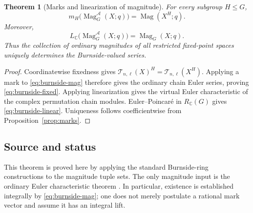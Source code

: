 \documentclass[11pt,a4paper]{article}
\numberwithin{equation}{section}
\newtheorem{theorem}{Theorem}[section]
\theoremstyle{definition}
\theoremstyle{remark}
\newcommand{\C}{\mathbb C}
\newcommand{\G}{G}
\newcommand{\Mag}{\operatorname{Mag}}
\newcommand{\RC}{R_{\C}}
\newcommand{\Burn}{\mathcal A}
\newcommand{\source}{\subsection*{\color{darkblue}Source and status}}
\begin{document}
\begin{theorem}[Marks and linearization of magnitude]
\label{thm:burnside-mag}
For every subgroup $H\leq\G$,
\begin{equation}\label{eq:burnside-fixed}
 m_H\bigl(\Mag^{\Burn}_\G(X;q)\bigr)=\Mag(X^H;q).
\end{equation}
Moreover,
\begin{equation}\label{eq:burnside-linear}
 L_\C\bigl(\Mag^{\Burn}_\G(X;q)\bigr)=\Mag_\G(X;q).
\end{equation}
Thus the collection of ordinary magnitudes of all restricted
fixed-point spaces uniquely determines the Burnside-valued series.
\end{theorem}
\begin{proof}
Coordinatewise fixedness gives
$\mathcal T_{n,\ell}(X)^H=\mathcal T_{n,\ell}(X^H)$.
Applying a mark to \eqref{eq:burnside-mag} therefore gives the
ordinary chain Euler series, proving \eqref{eq:burnside-fixed}.
Applying linearization gives the virtual Euler characteristic of
the complex permutation chain modules.  Euler--Poincar\'e in
$\RC(\G)$ gives \eqref{eq:burnside-linear}.  Uniqueness follows
coefficientwise from Proposition~\ref{prop:marks}.
\end{proof}
\source This theorem is proved here by applying the standard
Burnside-ring constructions to the magnitude tuple sets.  The only
magnitude input is the ordinary Euler characteristic theorem
\cite{HW,LS}.  In particular, existence is established integrally
by \eqref{eq:burnside-mag}; one does not merely postulate a rational
mark vector and assume it has an integral lift.
\end{document}
